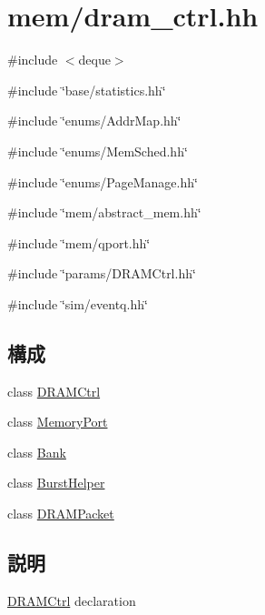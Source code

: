 \hypertarget{dram__ctrl_8hh}{
\section{mem/dram\_\-ctrl.hh}
\label{dram__ctrl_8hh}
}
{\ttfamily \#include $<$deque$>$}\par
{\ttfamily \#include \char`\"{}base/statistics.hh\char`\"{}}\par
{\ttfamily \#include \char`\"{}enums/AddrMap.hh\char`\"{}}\par
{\ttfamily \#include \char`\"{}enums/MemSched.hh\char`\"{}}\par
{\ttfamily \#include \char`\"{}enums/PageManage.hh\char`\"{}}\par
{\ttfamily \#include \char`\"{}mem/abstract\_\-mem.hh\char`\"{}}\par
{\ttfamily \#include \char`\"{}mem/qport.hh\char`\"{}}\par
{\ttfamily \#include \char`\"{}params/DRAMCtrl.hh\char`\"{}}\par
{\ttfamily \#include \char`\"{}sim/eventq.hh\char`\"{}}\par
\subsection*{構成}
\begin{DoxyCompactItemize}
\item 
class \hyperlink{classDRAMCtrl}{DRAMCtrl}
\item 
class \hyperlink{classDRAMCtrl_1_1MemoryPort}{MemoryPort}
\item 
class \hyperlink{classDRAMCtrl_1_1Bank}{Bank}
\item 
class \hyperlink{classDRAMCtrl_1_1BurstHelper}{BurstHelper}
\item 
class \hyperlink{classDRAMCtrl_1_1DRAMPacket}{DRAMPacket}
\end{DoxyCompactItemize}


\subsection{説明}
\hyperlink{classDRAMCtrl}{DRAMCtrl} declaration 